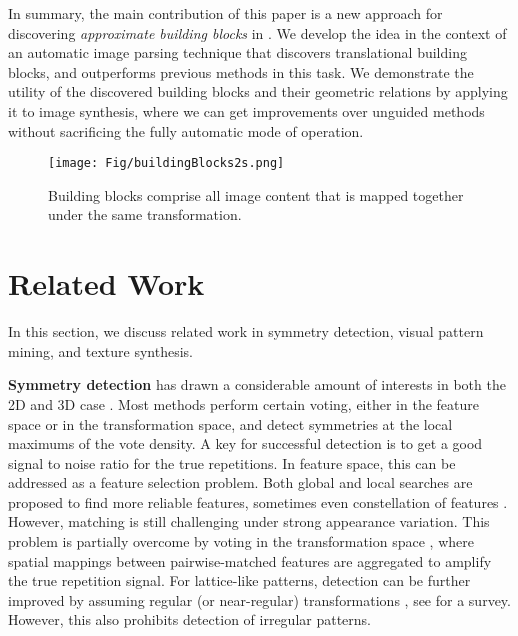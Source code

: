 \documentclass{acmtog}
\begin{document}
In summary, the main contribution of this paper is a new  approach for discovering \emph{approximate  building blocks} in . We develop the idea in the context of an automatic image parsing technique that discovers translational building blocks, and outperforms previous methods in this task. We demonstrate the utility of the discovered building blocks and their geometric relations by applying it to image synthesis, where we can get improvements over unguided methods without sacrificing the fully automatic mode of operation.

\begin{figure}
	\centering
		\texttt{[image: Fig/buildingBlocks2s.png]}
	\caption{Building blocks comprise all image content that is mapped together under the same transformation.}
	\label{fig:buildingBlocks}
\end{figure}

\section{Related Work}
\label{sec:RelatedWork}

In this section, we discuss related work in symmetry detection, visual pattern mining, and texture synthesis.

\textbf{Symmetry detection} has drawn a considerable amount of interests in both the 2D \cite{Lee2009SR,Wu2010DL} and 3D case \cite{Mitra2006PAA,Pauly2008,LIPMANsig2010,HuangMesh2013}. Most methods perform certain voting, either in the feature space or in the transformation space, and detect symmetries at the local maximums of the vote density. A key for successful detection is to get a good signal to noise ratio for the true repetitions. In feature space, this can be addressed as a feature selection problem. Both global \cite{Wang2008Factor,Agrawal2012RI,Bokeloh2009SD} and local \cite{Leung1996} searches are proposed to find more reliable features, sometimes even constellation of features \cite{Liu2013GRASP}.
%
However, matching is still challenging under strong appearance variation. This problem is partially overcome by voting in the transformation space \cite{Hays2006Texture,Mitra2006PAA}, where spatial mappings between pairwise-matched features are aggregated to amplify the true repetition signal. For lattice-like patterns, detection can be further improved by assuming regular (or near-regular) transformations \cite{Pauly2008,Wu2010DL,Zhao2011TS,Tai2012PF}, see \cite{Lin2006Eva} for a survey. However, this also prohibits detection of irregular patterns. 
\end{document}
